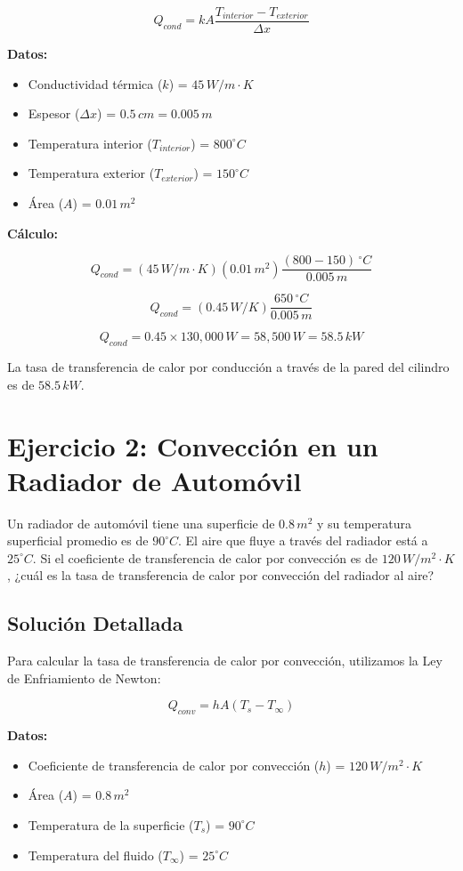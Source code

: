 \documentclass{article}
\begin{document}
$$ Q_{cond} = k A \frac{T_{interior} - T_{exterior}}{\Delta x} $$

\textbf{Datos:}
\begin{itemize}
    \item Conductividad térmica ($k$) = $45 \, W/m \cdot K$
    \item Espesor ($\Delta x$) = $0.5 \, cm = 0.005 \, m$
    \item Temperatura interior ($T_{interior}$) = $800^\circ C$
    \item Temperatura exterior ($T_{exterior}$) = $150^\circ C$
    \item Área ($A$) = $0.01 \, m^2$
\end{itemize}

\textbf{Cálculo:}

$$ Q_{cond} = (45 \, W/m \cdot K)(0.01 \, m^2) \frac{(800 - 150) \, ^\circ C}{0.005 \, m} $$

$$ Q_{cond} = (0.45 \, W/K) \frac{650 \, ^\circ C}{0.005 \, m} $$

$$ Q_{cond} = 0.45 \times 130,000 \, W = 58,500 \, W = 58.5 \, kW $$

La tasa de transferencia de calor por conducción a través de la pared del cilindro es de $58.5 \, kW$.

\section*{Ejercicio 2: Convección en un Radiador de Automóvil}

Un radiador de automóvil tiene una superficie de $0.8 \, m^2$ y su temperatura superficial promedio es de $90^\circ C$. El aire que fluye a través del radiador está a $25^\circ C$. Si el coeficiente de transferencia de calor por convección es de $120 \, W/m^2 \cdot K$, ¿cuál es la tasa de transferencia de calor por convección del radiador al aire?

\subsection*{Solución Detallada}

Para calcular la tasa de transferencia de calor por convección, utilizamos la Ley de Enfriamiento de Newton:

$$ Q_{conv} = h A (T_s - T_\infty) $$

\textbf{Datos:}
\begin{itemize}
    \item Coeficiente de transferencia de calor por convección ($h$) = $120 \, W/m^2 \cdot K$
    \item Área ($A$) = $0.8 \, m^2$
    \item Temperatura de la superficie ($T_s$) = $90^\circ C$
    \item Temperatura del fluido ($T_\infty$) = $25^\circ C$
\end{itemize}
\end{document}
